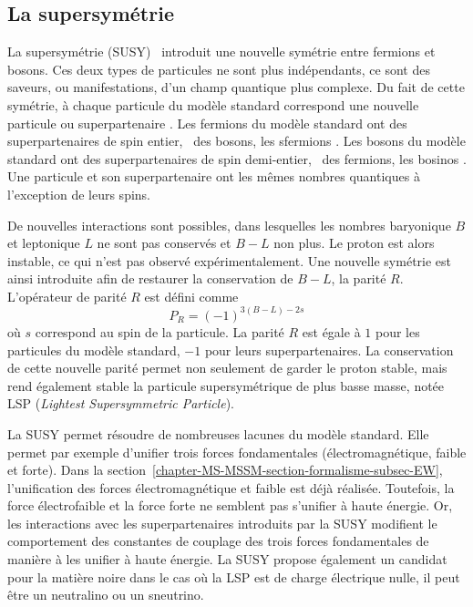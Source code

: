 \subsection{La supersymétrie}\label{chapter-MS-MSSM-section-BSM-subsec-SUSY}
La supersymétrie (SUSY)~\cite{susy_golfand,susy_wess,MARTIN_1998} introduit une nouvelle symétrie entre fermions et bosons.
Ces deux types de particules ne sont plus indépendants, ce sont des saveurs, ou manifestations, d'un champ quantique plus complexe.
Du fait de cette symétrie,
à chaque particule du modèle standard correspond une nouvelle particule ou \og superpartenaire \fg.
Les fermions du modèle standard ont des superpartenaires de spin entier, \ie\ des bosons, les \og sfermions \fg.
Les bosons du modèle standard ont des superpartenaires de spin demi-entier, \ie\ des fermions, les \og bosinos \fg.
Une particule et son superpartenaire ont les mêmes nombres quantiques à l'exception de leurs spins.
\par De nouvelles interactions sont possibles, dans lesquelles les nombres baryonique $B$ et leptonique $L$ ne sont pas conservés et $B-L$ non plus.
Le proton est alors instable, ce qui n'est pas observé expérimentalement.
Une nouvelle symétrie est ainsi introduite afin de restaurer la conservation de $B-L$, la parité $R$.
L'opérateur de parité $R$ est défini comme
\begin{equation}
P_R = (-1)^{3(B-L)-2s}
\end{equation}
où $s$ correspond au spin de la particule.
La parité $R$ est égale à $1$ pour les particules du modèle standard,
$-1$ pour leurs superpartenaires.
La conservation de cette nouvelle parité permet non seulement de garder le proton stable, mais rend également stable la particule supersymétrique de plus basse masse, notée LSP (\emph{Lightest Supersymmetric Particle}).
\par La SUSY permet résoudre de nombreuses lacunes du modèle standard.
Elle permet par exemple d'unifier trois forces fondamentales (électromagnétique, faible et forte).
Dans la section~\ref{chapter-MS-MSSM-section-formalisme-subsec-EW}, l'unification des forces électromagnétique et faible est déjà réalisée.
Toutefois, la force électrofaible et la force forte ne semblent pas s'unifier à haute énergie.
Or, les interactions avec les superpartenaires introduits par la SUSY modifient le comportement des constantes de couplage des trois forces fondamentales de manière à les unifier à haute énergie.
La SUSY propose également un candidat pour la matière noire dans le cas où la LSP est de charge électrique nulle, il peut être un neutralino ou un sneutrino.
